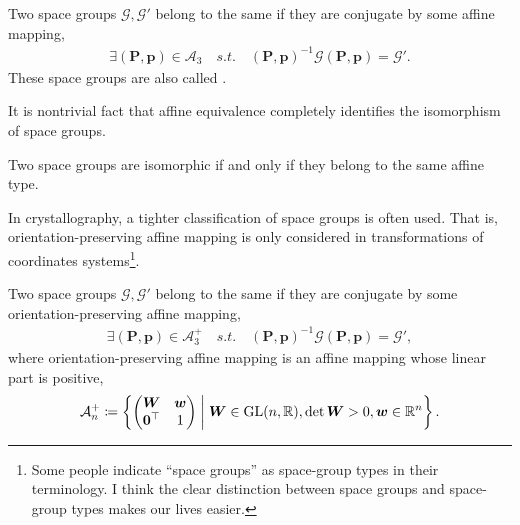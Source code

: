 \begin{screen}
  \begin{defn}
    Two space groups $\mathcal{G}, \mathcal{G}'$ belong to the same  if they are conjugate by some affine mapping,
    \begin{align}
      \exists (\bm{P}, \bm{p}) \in \mathcal{A}_{3} \quad s.t. \quad (\bm{P}, \bm{p})^{-1} \mathcal{G} (\bm{P}, \bm{p}) = \mathcal{G}'.
    \end{align}
    These space groups are also called .
  \end{defn}
\end{screen}

It is nontrivial fact that affine equivalence completely identifies the isomorphism of space groups.

\begin{screen}
  \begin{theorem}[Bieberbach]
    Two space groups are isomorphic if and only if they belong to the same affine type.
  \end{theorem}
\end{screen}

In crystallography, a tighter classification of space groups is often used.
That is, orientation-preserving affine mapping is only considered in transformations of coordinates systems\footnote{
  Some people indicate ``space groups'' as space-group types in their terminology.
  I think the clear distinction between space groups and space-group types makes our lives easier.
}.

\begin{screen}
  \begin{defn}
    Two space groups $\mathcal{G}, \mathcal{G}'$ belong to the same  if they are conjugate by some orientation-preserving affine mapping,
    \begin{align}
      \exists (\bm{P}, \bm{p}) \in \mathcal{A}^{+}_{3} \quad s.t. \quad (\bm{P}, \bm{p})^{-1} \mathcal{G} (\bm{P}, \bm{p}) = \mathcal{G}',
    \end{align}
    where orientation-preserving affine mapping is an affine mapping whose linear part is positive,
    \begin{align}
      \mathcal{A}^{+}_{n} \coloneqq \left\{  \begin{pmatrix} \bm{W} & \bm{w} \\ \bm{0}^{\top} & 1 \end{pmatrix}  \mathrel{}\middle|\mathrel{}  \bm{W} \in \mathrm{GL}(n, \mathbb{R}), \det \bm{W} > 0, \bm{w} \in \mathbb{R}^{n}  \right\}.
    \end{align}
  \end{defn}
\end{screen}

